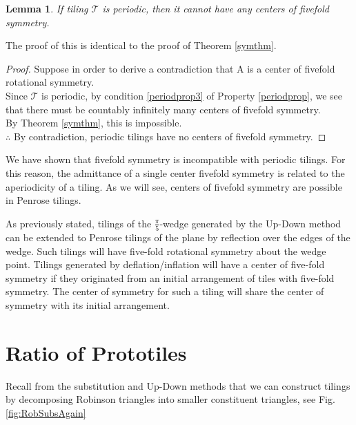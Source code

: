 \documentclass[
  oneside,
  11pt, a4paper,
  footinclude=true,
  headinclude=true,
  cleardoublepage=empty
]{scrbook}
\newtheorem{mylem}{Lemma}
\begin{document}
\begin{mylem}
If tiling $\mathcal{T}$ is periodic, then it cannot have any centers of fivefold symmetry.
\end{mylem}
The proof of this is identical to the proof of Theorem \ref{symthm}.
\begin{proof}
Suppose in order to derive a contradiction that A is a center of fivefold rotational symmetry.\\
Since $\mathcal{T}$ is periodic, by condition \ref{periodprop3} of Property \ref{periodprop}, we see that there must be countably infinitely many centers of fivefold symmetry.\\
By Theorem \ref{symthm}, this is impossible.\\
$\therefore$ By contradiction, periodic tilings have no centers of fivefold symmetry.
\end{proof}

We have shown that fivefold symmetry is incompatible with periodic tilings. For this reason, the admittance of a single center fivefold symmetry is related to the aperiodicity of a tiling. As we will see, centers of fivefold symmetry are possible in Penrose tilings. 

As previously stated, tilings of the $\frac{\pi}{5}$-wedge generated by the Up-Down method can be extended to Penrose tilings of the plane by reflection over the edges of the wedge. Such tilings will have five-fold rotational symmetry about the wedge point. Tilings generated by deflation/inflation will have a center of five-fold symmetry if they originated from an initial arrangement of tiles with five-fold symmetry. The center of symmetry for such a tiling will share the center of symmetry with its initial arrangement.  





\section{Ratio of Prototiles}
Recall from the substitution and Up-Down methods that we can construct tilings by decomposing Robinson triangles into smaller constituent triangles, see Fig.\ref{fig:RobSubsAgain}
\end{document}
